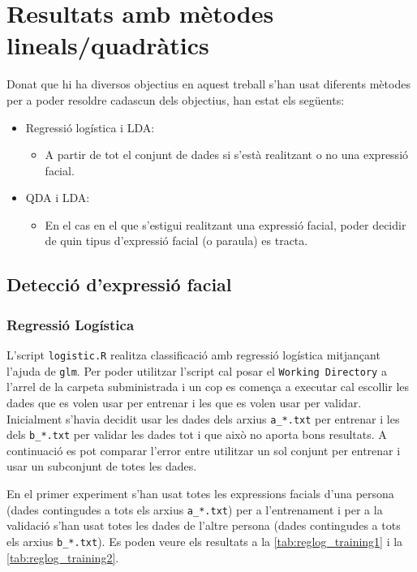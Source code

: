 \documentclass[a4paper]{article}
\begin{document}
\section{Resultats amb mètodes lineals/quadràtics}
Donat que hi ha diversos objectius en aquest treball s'han usat diferents mètodes per a poder resoldre cadascun dels objectius, han estat els següents:
\begin{itemize}
	\item Regressió logística i LDA:
	\begin{itemize}
		\item A partir de tot el conjunt de dades si s'està realitzant o no una expressió facial.
	\end{itemize}
	\item QDA i LDA:
	\begin{itemize}
		\item En el cas en el que s'estigui realitzant una expressió facial, poder decidir de quin tipus d'expressió facial (o paraula) es tracta.
	\end{itemize}
\end{itemize}

\subsection{Detecció d'expressió facial}
\subsubsection{Regressió Logística}
L'script \verb|logistic.R| realitza classificació amb regressió logística mitjançant l'ajuda de \verb|glm|. Per poder utilitzar l'script cal posar el \verb|Working Directory| a l'arrel de la carpeta subministrada i un cop es comença a executar cal escollir les dades que es volen usar per entrenar i les que es volen usar per validar. Inicialment s'havia decidit usar les dades dels arxius \verb|a_*.txt| per entrenar i les dels \verb|b_*.txt| per validar les dades tot i que això no aporta bons resultats. A continuació es pot comparar l'error entre utilitzar un sol conjunt per entrenar i usar un subconjunt de totes les dades.

En el primer experiment s'han usat totes les expressions facials d'una persona (dades contingudes a tots els arxius \verb|a_*.txt|) per a l'entrenament i per a la validació s'han usat totes les dades de l'altre persona (dades contingudes a tots els arxius \verb|b_*.txt|). Es poden veure els resultats a la \autoref{tab:reglog_training1} i la \autoref{tab:reglog_training2}.
\end{document}
